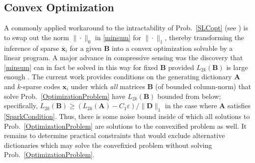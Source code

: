 \subsection{Convex Optimization}

A commonly applied workaround to the intractability of Prob.~\ref{SLCopt} (see \cite{tillmann2015computational}) is to swap out the norm $\|\cdot\|_0$ in \eqref{minsum} for $\|\cdot\|_1$, thereby transforming the inference of sparse $\mathbf{\overline x}_i$ for a given $\mathbf{B}$ into a convex optimization solvable by a linear program. A major advance in compressive sensing was the discovery that \eqref{minsum} can in fact be solved in this way for fixed $\mathbf{B}$ provided $L_{2k}(\mathbf{B})$ is large enough \cite{eldar2012compressed}. The current work provides conditions on the generating dictionary $\mathbf{A}$ and $k$-sparse codes $\mathbf{x}_i$ under which \emph{all} matrices $\mathbf{B}$ (of bounded column-norm) that solve Prob.~\ref{OptimizationProblem} have $L_{2k}(\mathbf{B})$ bounded from below; specifically, $L_{2k}(\mathbf{B}) \geq \left(L_{2k}(\mathbf{A}) - C_1\varepsilon \right) / \|\mathbf{D}\|_1$ in the case where $\mathbf{A}$ satisfies \eqref{SparkCondition}. Thus, there is some noise bound inside of which all solutions to Prob.~\ref{OptimizationProblem} are solutions to the convexified problem as well. It remains to determine practical constraints that would exclude alternative dictionaries which may solve the convefixied problem without solving Prob.~\ref{OptimizationProblem}. 



